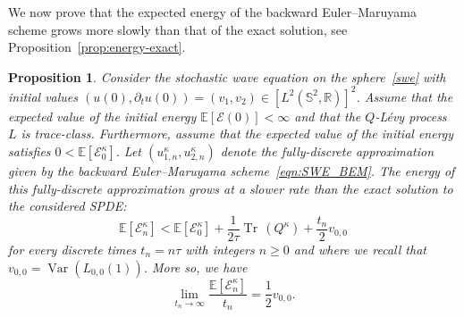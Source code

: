 \documentclass[11pt]{amsart}
\newtheorem{proposition}[theorem]{Proposition}
\newcommand{\R}{{\mathbb R}}
\newcommand{\E}{{\mathbb E}}
\newcommand{\IS}{\mathbb{S}}
\newcommand{\tr}{{\operatorname{Tr}\, }}
\newcommand{\cE}{\mathcal E}
\DeclareMathOperator{\Var}{Var}
\begin{document}
We now prove that the expected energy of the backward Euler--Maruyama scheme grows more slowly than that of the exact solution, see Proposition~\ref{prop:energy-exact}.
\begin{proposition}\label{prop:energy-bem}
Consider the stochastic wave equation on the sphere~\eqref{swe} with initial values $(u(0),\partial_tu(0))=(v_1,v_2)\in [L^2(\IS^2,\R)]^2$.
Assume that the expected value of the initial energy $\E\left[\mathcal{E}(0)\right]<\infty$ and that the $Q$-L\'evy process $L$ is trace-class.
Furthermore, assume that the expected value of the initial energy satisfies $0<\E\left[\mathcal{E}^\kappa_0\right]$.
Let $\left(u_{1,n}^\kappa, u_{2,n}^\kappa\right)$ denote the fully-discrete approximation given by the backward Euler--Maruyama scheme~\eqref{eqn:SWE_BEM}.
The energy of this fully-discrete approximation grows at a slower rate than the exact solution to the considered SPDE:
\begin{equation*}
		\E\left[\cE^\kappa_n\right] <
         \E\left[\cE^\kappa_0\right]+ \frac{1}{2\tau}\tr\left(Q^\kappa\right) + \frac {t_n} {2} v_{0,0}
\end{equation*}
for every discrete times $t_n=n\tau$ with integers $n\geq0$ and where we recall that $v_{0,0}=\Var(L_{0,0}(1))$. More so, we have
\begin{equation}\label{eqn:SWE_energy_BEM_limit}
    \lim_{t_n\to\infty}\frac{\E\left[\mathcal{E}^\kappa_n\right]}{t_n}=\frac 1 2 v_{0,0}.
\end{equation}
\end{proposition}
\end{document}
